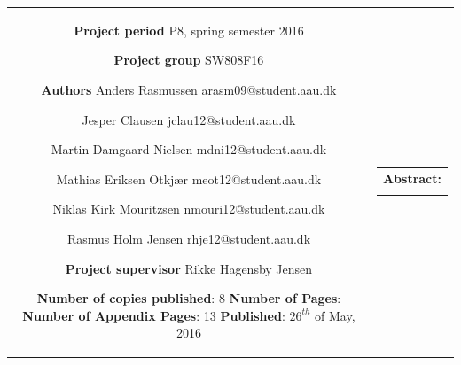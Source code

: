 \begin{nopagebreak}
{\begin{tabular}{cc}
{        \textbf{Project period} \\ 
        P8, spring semester 2016 \\

        \textbf{Project group} \\
        SW808F16 \\

        \textbf{Authors} \\
        Anders Rasmussen\\
        arasm09@student.aau.dk
        \\\\ 
        Jesper Clausen\\
        jclau12@student.aau.dk
        \\\\ 
        Martin Damgaard Nielsen\\
        mdni12@student.aau.dk
        \\\\ 
        Mathias Eriksen Otkjær\\
        meot12@student.aau.dk
        \\\\ 
        Niklas Kirk Mouritzsen\\
        nmouri12@student.aau.dk
        \\\\ 
        Rasmus Holm Jensen\\
        rhje12@student.aau.dk
        \\\\
        \textbf{Project supervisor} \\ 
        Rikke Hagensby Jensen \\

        \textbf{Number of copies published}: 8 \\
        \textbf{Number of Pages}: \pageref{LastPage} \\
        \textbf{Number of Appendix Pages}: 13 \\
        \textbf{Published}: $26^{th}$ of May, 2016 \\

        \vfill 

        } &
    \parbox{7cm}
    {
        \vspace{.15cm}
        \hfill 
        \begin{tabular}{l}
            {\bf Abstract:}\bigskip \\
            \fbox{
                \parbox{7cm}
                {
                    \bigskip
                    {\vfill{\small \bigskip}}
                }
            }
        \end{tabular}
    }

\end{tabular}}
\begin{center}
\end{center}

\restoregeometry
\end{nopagebreak}